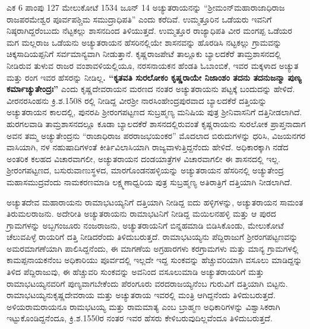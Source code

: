 {ಎಕ 6 ಪಾಂಪು 127 ಮೇಲುಕೋಟೆ 1534 ಜೂನ್​ 14} ಅಚ್ಯುತರಾಯನನ್ನು “ಶ‍್ರೀಮಂನ್​ ಮಹಾರಾಜಾಧಿರಾಜ ರಾಜಪರಮೇಶ್ವರ ಪೂರ್ವಪಶ್ಚಿಮ ಸಮುದ್ರಾಧಿಪತಿ” ಎಂದು ಕರೆದಿವೆ. ಉಮ್ಮತ್ತೂರಿನ ಒಡೆಯರು ಇವನಿಗೆ ನಿಷ್ಠರಾಗಿದ್ದರೆಂಬುದು ನೆಟ್ಟಕಲ್ಲು ಶಾಸನದಿಂದ ತಿಳಿಯುತ್ತದೆ. ಉಮ್ಮತ್ತೂರ ರಾಜ್ಯಾಧಿಪತಿ ವೀರ ಮಂಗಪ್ಪ ಒಡೆಯರ ಮಗ ಮಲ್ಲರಾಜ ಒಡೆಯನು ಅಚ್ಯುತರಾಯನ ಹೆಸರಿನಲ್ಲಿಯೇ ಶಾಸನವನ್ನು ಹೊರಡಿಸಿ ನಟ್ಟಕಲ್ಲು ಗ್ರಾಮವನ್ನು ಚಿಕ್ಕಸಾದಿಯಪ್ಪನಿಗೆ ಸರ್ವಮಾನ್ಯವಾಗಿ ನೀಡುತ್ತಾನೆ. ಕೃಷ್ಣರಾಜಪೇಟೆ ತಾಲ್ಲೂಕು ಬ್ಯಾಲದಕೆರೆ ತಾಮ್ರಶಾಸನದಲ್ಲಿ ನೀಡಿರುವ ತುಳುವ ರಾಜರ ವಂಶಾವಳಿಯಲ್ಲಿಯೂ, ನರಸನಾಯಕನ ಹೆಂಡತಿ ಓಬಾಂಬಿಕೆ, ಇವರ ಮಕ್ಕಳಾದ ಅಚ್ಯುತ ಮತ್ತು ರಂಗ ಇವರ ಹೆಸರನ್ನು ನೀಡಿಲ್ಲ\textbf{. “ಕೃತವತಿ ಸುರಲೋಕಂ ಕೃಷ್ಣರಾಯೇ ನಿಜಾಂಶಂ ತದನು ತದನುಜನ್ಮಾ ಪುಣ್ಯ ಕರ್ಮಾಚ್ಯುತೇಂದ್ರಃ”} ಎಂದು ಕೃಷ್ಣದೇವರಾಯನ ಮರಣದ ನಂತರ ಅಚ್ಯುತರಾಯನು ಪಟ್ಟಕ್ಕೆ ಬಂದುದನ್ನು ಹೇಳಿದೆ. ವೀರನರಸಿಂಹನು ಕ್ರಿ.ಶ.1508 ರಲ್ಲಿ ನೀಡಿದ್ದ ವೀರಶ‍್ರೀ ನಾರಸಿಂಹೇಂದ್ರಪುರವಾದ ಬ್ಯಾಲದಕೆರೆ ದತ್ತಿಯನ್ನು ಅಚ್ಯುತರಾಯನ ಕಾಲದಲ್ಲಿ, ಪುನರಪಿ ಶ‍್ರೀರಂಗಪಟ್ಟಣದ ಸುಬ್ರಹ್ಮಣ್ಯ ಮನಿಷಿಯ ಪುತ್ರ ಶ‍್ರೀನಿವಾಸನಿಗೆ ದತ್ತಿನೀಡಲಾಗಿದೆ. ಹುರಗಲವಾಡಿ ತಾಮ್ರಶಾಸನದಲ್ಲೂ ಕೂಡಾ ಬ್ಯಾಲದಕೆರೆ ಶಾಸನದಲ್ಲಿರುವಂತೆ ಕೃಷ್ಣರಾಯನು ಸುರಲೋಕ ಪ್ರಾಪ್ತನಾದಾಗ ಅವನ ತಮ್ಮ ಅಚ್ಯುತೇಂದ್ರನು “ರಾಜಾಧಿರಾಜ ಪರರಾಜಭಯಂಕರ” ಮೊದಲಾದ ಬಿರುದುಗಳನ್ನು ಧರಿಸಿ, ವಿಜಯನಗರ ವಾಸಿಯಾಗಿ, ನಳ ನಹುಷಾದಿಗಳಂತೆ ಕೀರ್ತಿವಿಲಾಸಿಯಾಗಿ ರಾಜ್ಯವಾಳುತ್ತಿದ್ದನೆಂದು ಹೇಳಿದೆ. ಅಧಿಕಾರಕ್ಕಾಗಿ ನಡೆದ ಅಂತರಿಕ ಕಲಹದ ವಿಚಾರವಾಗಲೀ, ಅಚ್ಯುತರಾಯನ ದಂಡಯಾತ್ರೆಗಳ ವಿಚಾರವಾಗಲೀ ಈ ಶಾಸನದಲ್ಲಿ ಇಲ್ಲ. ಶ‍್ರೀರಂಗಪಟ್ಟಣದ, ಬಸುರುವಾಣುಸ್ಥಳದ, ಮಾರಗೊಂಡನಹಳ್ಳಿಯನ್ನು ಅಚ್ಯುತರಾಯನ ಹೆಸರಿನಲ್ಲಿ ಅಚ್ಯುತೇಂದ್ರ ಮಹಾಸಮುದ್ರವೆಂದು ನಾಮಕರಣಮಾಡಿ ಲಕ್ಷ್ಮಣಾಧ್ವರಿಯ ಪುತ್ರ ಸುಬ್ರಹ್ಮಣ್ಯ ಅತಿರಾತ್ರಿಗೆ ದತ್ತಿಯಾಗಿ ನೀಡಲಾಗಿದೆ.

ಅಚ್ಯುತದೇವ ಮಹಾರಾಯನು ರಾಮಾಭಟಯ್ಯನಿಗೆ ದತ್ತಿಯಾಗಿ ನೀಡಿದ್ದ ಐದು ಹಳ್ಳಿಗಳನ್ನು, ಅಚ್ಯುತರಾಯನ ಸಾಮಂತ ತಿರುಮಲರಾಜನು. ಅದೇರೀತಿ ಅಚ್ಯುತರಾಯನು ರಾಮಾಭಟನಿಗೆ ನೀಡಿದ್ದ ಮಯಿಲನಹಳ್ಳಿ ಮತ್ತು ಆ ಪುರದ ಗ್ರಾಮಗಳನ್ನು ಅಬ್ಬಗಂಜೂರು ನಂಜರಾಜನು, ಅಚ್ಯುತರಾಯನಿಗೆ ಬಿನ್ನಹಮಾಡಿ ಬಿಡಿಸಿಕೊಂಡು, ಮೇಲುಕೋಟೆ ಚೆಲುವಪಿಳ್ಳೆ ರಾಯರಿಗೆ ದತ್ತಿ ನೀಡಿದರೆಂದು ತಿಳಿದುಬರುತ್ತದೆ. ರಾಮಾಭಟಯ್ಯನು ಪೆದ್ದಿರಾಜುಗೆ ಶ‍್ರೀರಂಗಪಟ್ಟಣವನ್ನು ಅಮರಮಾಗಣೆಯಾಗಿ ಪಾಲಿಸಿದ್ದನೆಂದು, ಈ ಮಾಗಣೆಯ ಅಗ್ರಹಾರಗಳು ಕರಗ್ರಾಮಗಳು ಮತ್ತು ಮಾನ್ಯ ಗ್ರಾಮಗಳಲ್ಲಿ ಕಾಮಪ್ಪನಾಯಕನೆಂಬ ಅಧಿಕಾರಿಯು ಪೂರ್ವದಲ್ಲಿ ಇಲ್ಲದೇ ಇದ್ದ ಸುಂಕವನ್ನು ಹೆಚ್ಚುವರಿಯಾಗಿ ವಸೂಲು ಮಾಡಿದ್ದನ್ನು ತಿಳಿದ ಪೆದ್ದಿರಾಜುವು, ಈ ಹೆಚ್ಚುವರಿ ಸುಂಕವನ್ನು ಅವನಿಂದ ವಸೂಲುಮಾಡಿ ಅಚ್ಯುತರಾಯರಿಗೆ ಮತ್ತು ರಾಮಾಭಟಯ್ಯನವರಿಗೆ ಪುಣ್ಯವಾಗಬೇಕೆಂದು ಪೆರಂಗೂರು ವರದರಾಜಯ್ಯನೆಂಬ ಗುರುವಿಗೆ ದತ್ತಿಯಾಗಿ ಬಿಟ್ಟನು. ರಾಮಾಭಟಯ್ಯನು\break ಕೃಷ್ಣದೇವರಾಯ ಮತ್ತು ಅಚ್ಯುತರಾಯ ಇವರಲ್ಲಿ ಮಂತ್ರಿ ಆಗಿದ್ದನೆಂದು ತಿಳಿದುಬರುತ್ತದೆ. ಅಳಿಯರಾಮರಾಯನೂ ರಾಮಭಟಯ್ಯ ಮತ್ತು ರಾಮಮಾತ್ಯ ಎಂಬ ಬ್ರಾಹ್ಮಣ ಅಧಿಕಾರಿಗಳನ್ನು ವಿಶ್ವಾಸಿಕರಾಗಿ ಇಟ್ಟುಕೊಂಡಿದ್ದನೆಂದೂ, ಕ್ರಿ.ಶ.1550ರ ನಂತರ ಇವರ ಹೆಸರು ಕೇಳಿಬರುವುದಿಲ್ಲವೆಂದೂ ತಿಳಿದುಬರುತ್ತದೆ.

